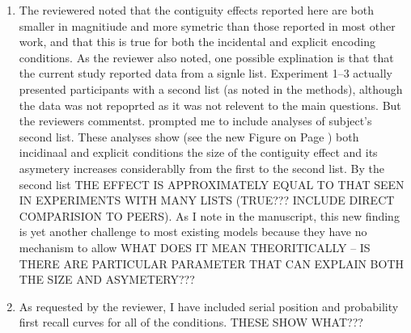 \documentclass[12pt]{article}
\begin{document}
\begin{enumerate}
\item
	The reviewered noted that the contiguity effects reported here are both smaller in magnitiude and more symetric than those reported in most other work, and that this is true for both the incidental and explicit encoding conditions. As the reviewer also noted, one possible explination is that that the current study reported data from a signle list. Experiment 1--3 actually presented participants with a second list (as noted in the methods), although the data was not repoprted as it was not relevent to the main questions. But the reviewers commentst. prompted me to include analyses of subject's second list. These analyses show (see the new Figure on Page \pageref{TODO-6}) both incidinaal and explicit conditions the size of the contiguity effect and its asymetery increases considerablly from the first to the second list. By the second list THE EFFECT IS APPROXIMATELY EQUAL TO THAT SEEN IN EXPERIMENTS WITH MANY LISTS (TRUE??? INCLUDE DIRECT COMPARISION TO PEERS). As I note in the manuscript, this new finding is yet another challenge to most existing models because they have no mechanism to allow WHAT DOES IT MEAN THEORITICALLY -- IS THERE ARE PARTICULAR PARAMETER THAT CAN EXPLAIN BOTH THE SIZE AND ASYMETERY??? 

\item
	As requested by the reviewer, I have included serial position and probability first recall curves for all of the conditions. THESE SHOW WHAT??? \pageref{TODO-7}



\end{enumerate}


\vspace{20pt}
\end{document}
